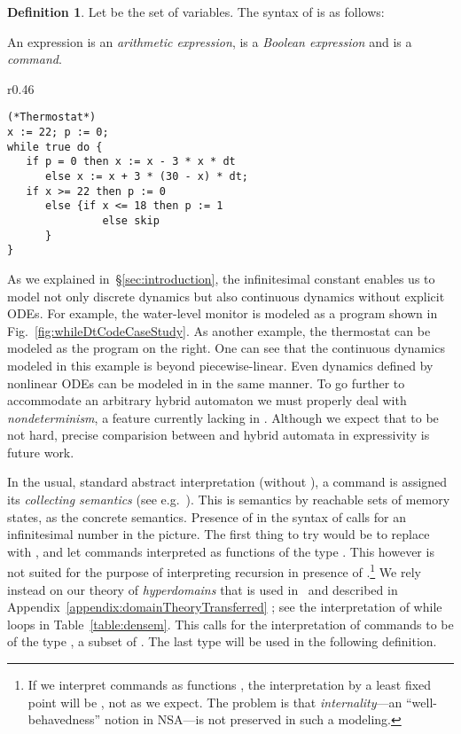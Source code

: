 \documentclass[envcountsect,orivec]{llncs} \pdfoutput=1
\theoremstyle{definition}
\newtheorem{mydef}[mythm]{Definition}
\begin{document}
\begin{mydef}Let  be the set of variables.
The syntax of  is as follows:

An expression  is an \emph{arithmetic expression},  is a \emph{Boolean expression} and  is a \emph{command}.
\end{mydef}

\begin{wrapfigure}[9]{r}{0.46\hsize}
\vspace{-1em}
\begingroup
 \fontsize{7pt}{8pt}\selectfont
  \begin{verbatim}
(*Thermostat*)
x := 22; p := 0;
while true do {
   if p = 0 then x := x - 3 * x * dt 
      else x := x + 3 * (30 - x) * dt;
   if x >= 22 then p := 0
      else {if x <= 18 then p := 1
               else skip
      }
}
\end{verbatim}
\endgroup 
\vspace{-1.7em}
\caption{Thermostat in }
\label{fig:thermostat} 
\end{wrapfigure}
As we explained in~\S{}\ref{sec:introduction}, the infinitesimal constant  enables us to model not only discrete dynamics but also continuous dynamics without explicit ODEs.
For example, the water-level monitor is modeled as a  program shown in Fig.~\ref{fig:whileDtCodeCaseStudy}.
As another example, the thermostat can be modeled as the program on the right.
One can see that the continuous dynamics modeled in this example is beyond piecewise-linear.
Even dynamics defined by nonlinear ODEs can be modeled in  in
the same manner. To go further to accommodate an arbitrary hybrid automaton we must
properly deal with \emph{nondeterminism}, a feature currently lacking in
. Although we expect that to be not hard, precise comparision
between  and hybrid automata in expressivity is future work.

In the usual, standard abstract interpretation (without ), a
command  is assigned its \emph{collecting semantics}
 (see e.g.~\cite{Cousot1977}). This is semantics by reachable sets of memory states,  as the concrete semantics.
Presence of  in the syntax of   calls for an
infinitesimal number in the picture.
The first thing to try would be to replace  with , and
let   commands interpreted as functions of  the type
. This however is not suited for the
purpose of interpreting recursion in presence of .\footnote{If we interpret commands
as functions  , the interpretation
 by a least fixed point
will be , not
 as we expect. The problem is that
\emph{internality}---an ``well-behavedness'' notion in
NSA---is not preserved in such a modeling.} We rely instead on our theory of
\emph{hyperdomains} that is used in~\cite{Suenaga2013} and
 described in Appendix~\ref{appendix:domainTheoryTransferred}
; see the
interpretation of while loops in Table~\ref{table:densem}. This calls
for the interpretation of commands to be of the type ,  a subset of 
. The last type will be used in the following definition.
\end{document}
